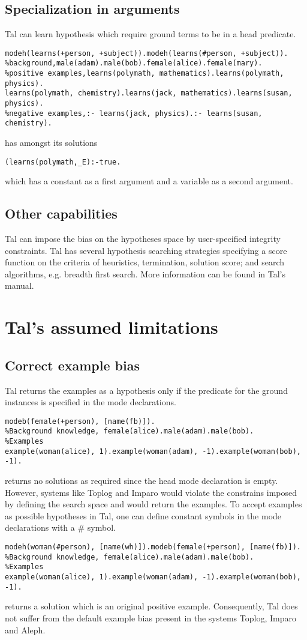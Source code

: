 \subsection{Specialization in arguments}
Tal can learn hypothesis which require ground terms to be in a head predicate.
\begin{lstlisting}
modeh(learns(+person, +subject)).modeh(learns(#person, +subject)).
%background,male(adam).male(bob).female(alice).female(mary).
%positive examples,learns(polymath, mathematics).learns(polymath, physics).
learns(polymath, chemistry).learns(jack, mathematics).learns(susan, physics).
%negative examples,:- learns(jack, physics).:- learns(susan, chemistry).
\end{lstlisting}
has amongst its solutions
\begin{lstlisting}
(learns(polymath,_E):-true.
\end{lstlisting}
which has a constant  as a first argument and a variable as a second argument.
\subsection{Other capabilities}
Tal can impose the bias on the hypotheses space by user-specified integrity constraints. Tal has several hypothesis searching strategies specifying a score function on the criteria of heuristics, termination, solution score; and search algorithms, e.g. breadth first search. More information can be found in Tal's manual.

\section{Tal's assumed limitations}

\subsection{Correct example bias}
Tal returns the examples as a hypothesis only if the predicate for the ground instances is specified in the mode declarations.
\begin{lstlisting}
modeb(female(+person), [name(fb)]).
%Background knowledge, female(alice).male(adam).male(bob).
%Examples
example(woman(alice), 1).example(woman(adam), -1).example(woman(bob), -1).
\end{lstlisting}
returns no solutions as required since the head mode declaration is empty. However, systems like Toplog and Imparo would violate the constrains imposed by defining the search space and would return the examples.
To accept examples as possible hypotheses in Tal, one can define constant symbols in the mode declarations with a \# symbol.
\begin{lstlisting}
modeh(woman(#person), [name(wh)]).modeb(female(+person), [name(fb)]).
%Background knowledge, female(alice).male(adam).male(bob).
%Examples
example(woman(alice), 1).example(woman(adam), -1).example(woman(bob), -1).
\end{lstlisting}
returns a solution  which is an original positive example. Consequently, Tal does not suffer from the default example bias present in the systems Toplog, Imparo and Aleph.

